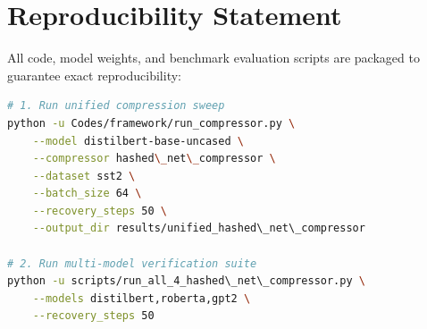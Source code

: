 \section{Reproducibility Statement}
All code, model weights, and benchmark evaluation scripts are packaged to guarantee exact reproducibility:
\begin{lstlisting}[language=bash]
# 1. Run unified compression sweep
python -u Codes/framework/run_compressor.py \
    --model distilbert-base-uncased \
    --compressor hashed\_net\_compressor \
    --dataset sst2 \
    --batch_size 64 \
    --recovery_steps 50 \
    --output_dir results/unified_hashed\_net\_compressor

# 2. Run multi-model verification suite
python -u scripts/run_all_4_hashed\_net\_compressor.py \
    --models distilbert,roberta,gpt2 \
    --recovery_steps 50
\end{lstlisting}
